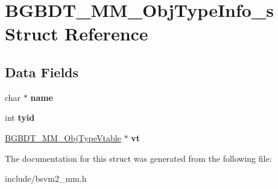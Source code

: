 \hypertarget{structBGBDT__MM__ObjTypeInfo__s}{\section{B\-G\-B\-D\-T\-\_\-\-M\-M\-\_\-\-Obj\-Type\-Info\-\_\-s Struct Reference}
\label{structBGBDT__MM__ObjTypeInfo__s}
}
\subsection*{Data Fields}
\begin{DoxyCompactItemize}
\item 
\hypertarget{structBGBDT__MM__ObjTypeInfo__s_abe10596d8123f8ff615b59820e95e8a4}{char $\ast$ {\bfseries name}}\label{structBGBDT__MM__ObjTypeInfo__s_abe10596d8123f8ff615b59820e95e8a4}

\item 
\hypertarget{structBGBDT__MM__ObjTypeInfo__s_a6b5a9af863a2902066890c27a020ba4b}{int {\bfseries tyid}}\label{structBGBDT__MM__ObjTypeInfo__s_a6b5a9af863a2902066890c27a020ba4b}

\item 
\hypertarget{structBGBDT__MM__ObjTypeInfo__s_a81e63e437042b80f453d478e3baf3e12}{\hyperlink{structBGBDT__MM__ObjTypeVtable__s}{B\-G\-B\-D\-T\-\_\-\-M\-M\-\_\-\-Obj\-Type\-Vtable} $\ast$ {\bfseries vt}}\label{structBGBDT__MM__ObjTypeInfo__s_a81e63e437042b80f453d478e3baf3e12}

\end{DoxyCompactItemize}


The documentation for this struct was generated from the following file\-:\begin{DoxyCompactItemize}
\item 
include/bsvm2\-\_\-mm.\-h\end{DoxyCompactItemize}
